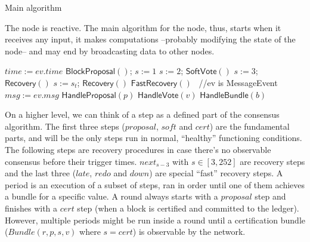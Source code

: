\documentclass[10pt,a4paper]{article}
\begin{document}
\begin{section}{Main algorithm}
%

The node is reactive. The main algorithm for the node, thus, starts when it receives 
any input, it makes computations --probably modifying the state of the node-- and 
may end by broadcasting data to other nodes.

\begin{algorithm}[H]
    \caption{\underline{Main node algorithm}}
    \label{algo:main}
    \begin{algorithmic}[1]
    
        \State $time := ev.time$
            \State $\mathsf{BlockProposal}()$; $s:=1$
            \State $s:=2$; $\mathsf{SoftVote}()$
            \State $s:=3$; $\mathsf{Recovery}()$
        \ElsIf{$time\in[\max\{4\lambda, \Lambda \} + 2^{s_t-3}\lambda, \max\{4\lambda, \Lambda \} + 2^{s_t-2}\lambda)$ for some $s\le s_t \le 252$}
            \State $s:=s_t $; $\mathsf{Recovery}()$
            \State $\mathsf{FastRecovery}()$
        \EndIf
    \Else \ //ev is MessageEvent
        \State $msg := ev.msg$
            \State $\mathsf{HandleProposal}(p)$
            \State $\mathsf{HandleVote}(v)$
            \State $\mathsf{HandleBundle}(b)$
        \EndIf
    \EndIf

    \EndFunction
    \end{algorithmic}
\end{algorithm}

On a higher level, we can think of a step as a defined part of the consensus algorithm. The first three steps
($proposal$, $soft$ and $cert$)
are the fundamental parts, and will be the only steps run in normal, ``healthy'' functioning conditions.
The following steps are recovery procedures in case there's no observable consensus before their trigger times.
$next_{s-3}$ with $s \in [3, 252]$ are recovery steps and the last three ($late$, $redo$ and $down$)
are special ``fast'' recovery steps.
A period is an execution of a subset of steps, ran in order until one of them achieves 
a bundle for a specific value. A round always starts with a $proposal$ step and finishes with a $cert$
step (when a block is certified and committed to the ledger). However, multiple periods might
be run inside a round until a certification bundle ($Bundle(r,p,s,v) $ where $s = cert$) is observable by the network.


\end{section}
\end{document}
